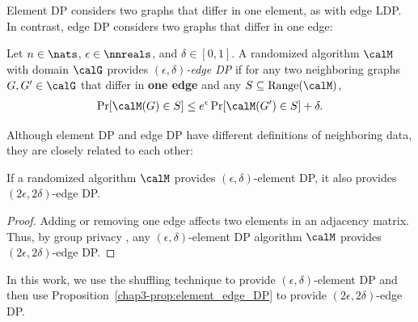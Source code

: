 Element DP considers two graphs that differ in one element, as with edge LDP. 
In contrast, edge DP \cite{Raskhodnikova_Encyclopedia16} considers two graphs that differ in one edge: 

\begin{definition}  \label{chap3-def:edge_DP} 
Let $n \in \nats$, $\epsilon \in \nnreals$, and $\delta \in [0,1]$. 
A randomized algorithm $\calM$ with domain $\calG$ provides \emph{$(\epsilon, \delta)$-edge DP} 
if for any two neighboring graphs $G, G' \in \calG$ that differ in \textbf{one edge} and any $S \subseteq \mathrm{Range}(\calM)$, 
\begin{align}
\Pr[\calM(G) \in S] \leq e^\epsilon \Pr[\calM(G') \in S] + \delta.
\label{chap3-eq:edge_DP}
\end{align}
\end{definition}

Although element DP and edge DP have different definitions of neighboring data, they are closely related to each other:

\begin{proposition}\label{chap3-prop:element_edge_DP}
If a randomized algorithm $\calM$ provides $(\epsilon, \delta)$-element DP, it also provides $(2\epsilon, 2\delta)$-edge DP. 
\end{proposition}
\begin{proof}
Adding or removing one edge affects two elements in an adjacency matrix. 
Thus, by group privacy \cite{DP}, any 
$(\epsilon, \delta)$-element DP 
algorithm $\calM$ 
provides $(2\epsilon, 2\delta)$-edge DP. 
\end{proof}

In this work, we use the shuffling technique to provide $(\epsilon, \delta)$-element DP and then use Proposition~\ref{chap3-prop:element_edge_DP} to provide $(2\epsilon, 2\delta)$-edge DP. 

